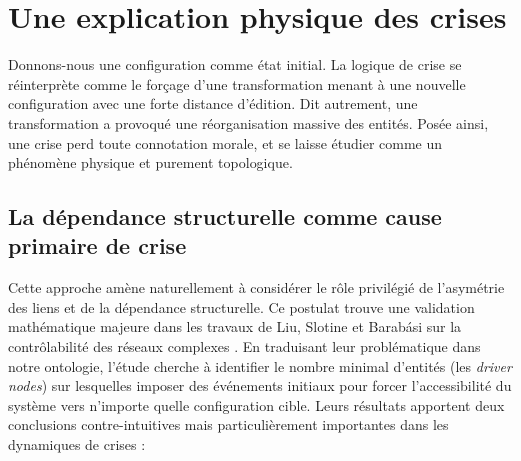 \documentclass{report}
\begin{document}
	\section{Une explication physique des crises}
	
	Donnons-nous une configuration comme état initial. La logique de crise se réinterprète comme le forçage d'une transformation menant à une nouvelle configuration avec une forte distance d'édition. Dit autrement, une transformation a provoqué une réorganisation massive des entités. Posée ainsi, une crise perd toute connotation morale, et se laisse étudier comme un phénomène physique et purement topologique. 
	
	\subsection*{La dépendance structurelle comme cause primaire de crise}
	Cette approche amène naturellement à considérer le rôle privilégié de l'asymétrie des liens et de la dépendance structurelle. Ce postulat trouve une validation mathématique majeure dans les travaux de Liu, Slotine et Barabási sur la contrôlabilité des réseaux complexes \cite{Controlability}. En traduisant leur problématique dans notre ontologie, l'étude cherche à identifier le nombre minimal d'entités (les \textit{driver nodes}) sur lesquelles imposer des événements initiaux pour forcer l'accessibilité du système vers n'importe quelle configuration cible. Leurs résultats apportent deux conclusions contre-intuitives mais particulièrement importantes dans les dynamiques de crises : 
	
\end{document}
